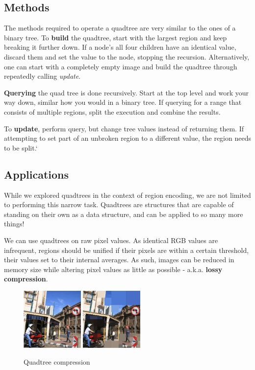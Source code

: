 \documentclass{article}
\begin{document}
\subsection{Methods}
The methods required to operate a quadtree are very similar to the ones of a binary tree. To \textbf{build} the quadtree, start with the largest region and keep breaking it further down. If a node's all four children have an identical value, discard them and set the value to the node, stopping the recursion. Alternatively, one can start with a completely empty image and build the quadtree through repeatedly calling \textit{update}.

\textbf{Querying} the quad tree is done recursively. Start at the top level and work your way down, similar how you would in a binary tree. If querying for a range that consists of multiple regions, split the execution and combine the results.

To \textbf{update}, perform query, but change tree values instead of returning them. If attempting to set part of an unbroken region to a different value, the region needs to be split.`

\subsection{Applications}
While we explored quadtrees in the context of region encoding, we are not limited to performing this narrow task. Quadtrees are structures that are capable of standing on their own as a data structure, and can be applied to so many more things!

We can use quadtrees on raw pixel values. As identical RGB values are infrequent, regions should be unified if their pixels are within a certain threshold, their values set to their internal averages. As such, images can be reduced in memory size while altering pixel values as little as possible - a.k.a. \textbf{lossy compression}.
\begin{figure}[!htb]
    \begin{center}
        \includegraphics[width=0.275\textwidth]{quadtree_raw.png}
        \hspace{15pt}
        \includegraphics[width=0.275\textwidth]{quadtree_compressed.png}
    \end{center}
    \vspace{-10pt}
    \caption{Quadtree compression}
\end{figure}
\end{document}
